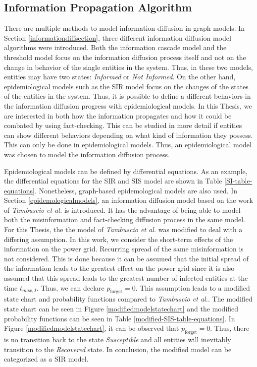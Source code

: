 \subsection{Information Propagation Algorithm}
\label{modelinformationdiffusion}

There are multiple methods to model information diffusion in graph models.
In Section \ref{informationdiffsection}, three different information diffusion
model algorithms were introduced.
Both the information cascade model and the threshold model focus on the 
information diffusion process itself and not on the change in behavior
of the single entities in the system. Thus, in these two models,
entities may have two states: 
\textit{Informed} or \textit{Not Informed}.
On the other hand, epidemiological models such as the SIR model
focus on the changes of the states of the entities in the system.
Thus, it is possible to define a different behaviors in the
information diffusion progress with epidemiological models. 
In this Thesis, we are interested in both how the information
propagates and how it could be combated by using fact-checking.
This can be studied in more detail if entities can 
show different behaviors depending on what kind of information
they possess. This can only be done in epidemiological models.
Thus, an epidemiological model was chosen to model the information 
diffusion process.

Epidemiological models can be defined by differential equations.
As an example, the differential equations for the SIR and SIS 
model are shown in Table \ref{SI-table-equations}.
Nonetheless, graph-based epidemological models are also used.
In Section \ref{epidemologicalmodels}, an information 
diffusion model based on the work of \textit{Tambuscio et al.} 
\cite{sirsmodel} is introduced. It has the advantage of being 
able to model both the misinformation and fact-checking 
diffusion process in the same model. 
For this Thesis, the the model of \textit{Tambuscio et al.} was
modified to deal with a differing assumption.
In this work, we consider the short-term effects of the information 
on the power grid. Recurring spread of the same misinformation
is not considered. This is done because it can be 
assumed that the initial spread of the information leads to the 
greatest effect on the power grid since it is also assumed that this
spread leads to the greatest number of infected entities at
the time $t_{max,I}$. Thus, we can declare $p_{\mathrm{forget}} = 0$.
This assumption leads to a modified state chart and probability
functions compared to \textit{Tambuscio et al.}. The modified
state chart can be seen in Figure \ref{modifiedmodelstatechart}
and the modified probability functions can be seen in Table
\ref{modified-SIS-table-equations}. In Figure 
\ref{modifiedmodelstatechart}, it can be observed that 
$p_{\mathrm{forget}} = 0$. Thus, there is no transition back to 
the state \textit{Susceptible} and all entities
will inevitably transition to the \textit{Recovered} state. 
In conclusion, the modified model can be categorized as a SIR model. 


